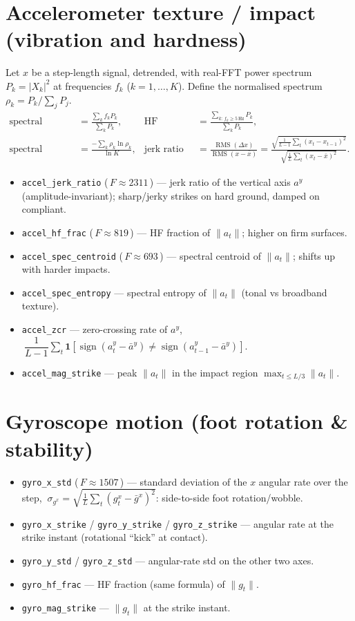 \documentclass[11pt]{article}
\newcommand{\code}[1]{\texttt{#1}}
\newcommand{\Fval}[1]{{\small(\,$F\!\approx\!#1$\,)}}
\begin{document}
\section{Accelerometer texture / impact (vibration and hardness)}
Let $x$ be a step-length signal, detrended, with real-FFT power spectrum $P_k=\lvert X_k\rvert^2$ at
frequencies $f_k$ ($k=1,\dots,K$). Define the normalised spectrum $\rho_k=P_k/\sum_j P_j$.
\begin{align}
\text{spectral centroid} &= \frac{\sum_k f_k P_k}{\sum_k P_k}, &
\text{HF fraction} &= \frac{\sum_{k:\,f_k\ge 5\,\text{Hz}} P_k}{\sum_k P_k}, \\[2pt]
\text{spectral entropy} &= \frac{-\sum_k \rho_k\ln\rho_k}{\ln K}, &
\text{jerk ratio} &= \frac{\operatorname{RMS}(\Delta x)}{\operatorname{RMS}(x-\bar x)}
 = \frac{\sqrt{\tfrac1{L-1}\sum_t(x_t-x_{t-1})^2}}{\sqrt{\tfrac1L\sum_t(x_t-\bar x)^2}}.
\end{align}
\begin{itemize}
  \item \code{accel_jerk_ratio} \Fval{2311} --- jerk ratio of the vertical axis $a^y$
  (amplitude-invariant); sharp/jerky strikes on hard ground, damped on compliant.
  \item \code{accel_hf_frac} \Fval{819} --- HF fraction of $\lVert a_t\rVert$; higher on firm surfaces.
  \item \code{accel_spec_centroid} \Fval{693} --- spectral centroid of $\lVert a_t\rVert$; shifts up
  with harder impacts.
  \item \code{accel_spec_entropy}  --- spectral entropy of $\lVert a_t\rVert$ (tonal vs
  broadband texture).
  \item \code{accel_zcr} --- zero-crossing rate of $a^y$,
  $\ \dfrac{1}{L-1}\sum_{t}\mathbf 1\!\left[\operatorname{sign}(a^y_t-\bar a^y)\neq
  \operatorname{sign}(a^y_{t-1}-\bar a^y)\right]$.
  \item \code{accel_mag_strike} --- peak $\lVert a_t\rVert$ in the impact region
  $\max_{t\le L/3}\lVert a_t\rVert$.
\end{itemize}

\section{Gyroscope motion (foot rotation \& stability)}
\begin{itemize}
  \item \code{gyro_x_std} \Fval{1507} --- standard deviation of the $x$ angular rate over the step,
  $\ \sigma_{g^x}=\sqrt{\tfrac1L\sum_t (g^x_t-\bar g^x)^2}$: side-to-side foot rotation/wobble.
  \item \code{gyro_x_strike} / \code{gyro_y_strike} / \code{gyro_z_strike} --- angular rate at the
  strike instant (rotational ``kick'' at contact).
  \item \code{gyro_y_std} / \code{gyro_z_std} --- angular-rate std on the other two axes.
  \item \code{gyro_hf_frac}  --- HF fraction (same formula) of $\lVert g_t\rVert$.
  \item \code{gyro_mag_strike} --- $\lVert g_t\rVert$ at the strike instant.
\end{itemize}
\end{document}
